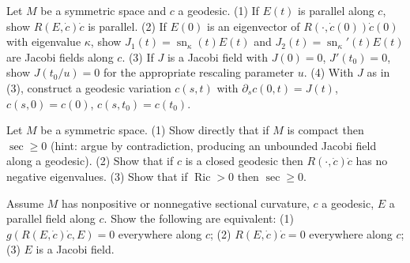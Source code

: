 \begin{remark}
  \label{rem:pet-ch10-exercise-jacobi-fields-eigenvector}

  Let $M$ be a symmetric space and $c$ a geodesic. (1) If $E(t)$ is parallel
  along $c$, show $R(E,\dot c)\dot c$ is parallel. (2) If $E(0)$ is an eigenvector
  of $R(\cdot,\dot c(0))\dot c(0)$ with eigenvalue $\kappa$, show
  $J_1(t)=\operatorname{sn}_\kappa(t)E(t)$ and $J_2(t)=\operatorname{sn}_\kappa'(t)E(t)$ are Jacobi
  fields along $c$. (3) If $J$ is a Jacobi field with $J(0)=0$, $J'(t_0)=0$, show
  $J(t_0/u)=0$ for the appropriate rescaling parameter $u$. (4) With $J$ as in
  (3), construct a geodesic variation $c(s,t)$ with $\partial_sc(0,t)=J(t)$,
  $c(s,0)=c(0)$, $c(s,t_0)=c(t_0)$.
\end{remark}

\begin{remark}
  \label{rem:pet-ch10-exercise-compact-nonneg-curvature}

  Let $M$ be a symmetric space. (1) Show directly that if $M$ is compact then
  $\sec\ge0$ (hint: argue by contradiction, producing an unbounded Jacobi field
  along a geodesic). (2) Show that if $c$ is a closed geodesic then
  $R(\cdot,\dot c)\dot c$ has no negative eigenvalues. (3) Show that if
  $\operatorname{Ric}>0$ then $\sec\ge0$.
\end{remark}

\begin{remark}
  \label{rem:pet-ch10-exercise-jacobi-field-equivalence}

  Assume $M$ has nonpositive or nonnegative sectional curvature, $c$ a geodesic,
  $E$ a parallel field along $c$. Show the following are equivalent: (1)
  $g(R(E,\dot c)\dot c,E)=0$ everywhere along $c$; (2) $R(E,\dot c)\dot c=0$
  everywhere along $c$; (3) $E$ is a Jacobi field.
\end{remark}

